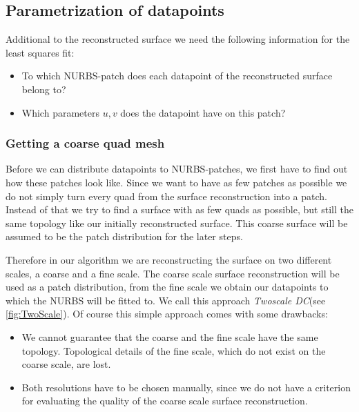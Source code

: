 \subsection{Parametrization of datapoints}
Additional to the reconstructed surface we need the following information for the least squares fit: 
\begin{itemize}
\item To which \ac{NURBS}-patch does each datapoint of the reconstructed surface belong to?
\item Which parameters $u,v$ does the datapoint have on this patch?
\end{itemize}
\subsubsection{Getting a coarse quad mesh }
Before we can distribute datapoints to \ac{NURBS}-patches, we first have to find out how these patches look like. Since we want to have as few patches as possible we do not simply turn every \ac{quad} from the surface reconstruction into a patch. Instead of that we try to find a surface with as few \acp{quad} as possible, but still the same topology like our initially reconstructed surface. This coarse surface will be assumed to be the patch distribution for the later steps.

Therefore in our algorithm we are reconstructing the surface on two different scales, a coarse and a fine scale. The coarse scale surface reconstruction will be used as a patch distribution, from the fine scale we obtain our datapoints to which the \ac{NURBS} will be fitted to. We call this approach \emph{Twoscale \acl{DC}}(see \autoref{fig:TwoScale}).
Of course this simple approach comes with some drawbacks:
\begin{itemize}
\item We cannot guarantee that the coarse and the fine scale have the same topology. Topological details of the fine scale, which do not exist on the coarse scale, are lost.
\item Both resolutions have to be chosen manually, since we do not have a criterion for evaluating the quality of the coarse scale surface reconstruction.
\end{itemize}
